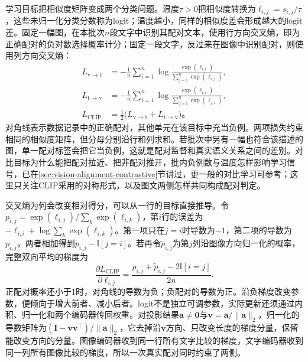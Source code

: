 学习目标把相似度矩阵变成两个分类问题。温度$\tau>0$把相似度转换为$\ell_{i,j}=s_{i,j}/\tau$，这些未归一化分类分数称为logit；温度越小，同样的相似度差会形成越大的logit差。固定一幅图，在本批次$n$段文字中识别其配对文本，使用行方向交叉熵，即为正确配对的负对数选择概率计分；固定一段文字，反过来在图像中识别配对，则使用列方向交叉熵：
\begin{equation}
  \begin{aligned}
    L_{\mathrm{v\to t}}
      &=-\frac1n\sum_{i=1}^n
        \log\frac{\exp(\ell_{i,i})}{\sum_{j=1}^n\exp(\ell_{i,j})},\\
    L_{\mathrm{t\to v}}
      &=-\frac1n\sum_{i=1}^n
        \log\frac{\exp(\ell_{i,i})}{\sum_{j=1}^n\exp(\ell_{j,i})},\\
    L_{\mathrm{CLIP}}&=\tfrac12
        \bigl(L_{\mathrm{v\to t}}+L_{\mathrm{t\to v}}\bigr)\text{。}
  \end{aligned}
  \label{eq:vision-clip-loss}
\end{equation}
对角线表示数据记录中的正确配对，其他单元在该目标中充当负例。两项损失约束相同的相似度矩阵，但分母分别沿行和列求和。若批次中另有一幅也符合该描述的图，单一配对标签会把它当负例，这就是配对监督和真实语义关系之间的差别。对比目标为什么能把配对拉近、把非配对推开，批内负例数与温度怎样影响学习信号，已在\ref{sec:vision-alignment-contrastive}节讲过，更一般的对比学习可参考；这里只关注CLIP采用的对称形式，以及图文两侧怎样共同构成配对判定。

交叉熵为何会改变相对得分，可以从一行的目标直接推导。令$p_{i,j}=\exp(\ell_{i,j})/\sum_k\exp(\ell_{i,k})$，第$i$行的误差为$-\ell_{i,i}+\log\sum_k\exp(\ell_{i,k})$。第一项只在$j=i$时导数为$-1$，第二项的导数为$p_{i,j}$，两者相加得到$p_{i,j}-\mathbb I[j=i]$。若再令$\widetilde p_{i,j}$为第$j$列沿图像方向归一化的概率，完整双向平均的梯度为
\begin{equation}
  \frac{\partial L_{\mathrm{CLIP}}}{\partial\ell_{i,j}}
   =\frac{p_{i,j}+\widetilde p_{i,j}
                 -2\mathbb I[i=j]}{2n}.
  \label{eq:vision-clip-logit-gradient}
\end{equation}
正配对概率还小于1时，对角线的导数为负；负配对的导数为正。沿负梯度改变参数，便倾向于增大前者、减小后者。logit不是独立可调参数，实际更新还须通过内积、归一化和两个编码器传回权重。对投影结果$\bm a\ne\bm0$与$\bm v=\bm a/\lVert\bm a\rVert_2$，归一化的导数矩阵为$(\bm I-\bm v\bm v^\top)/\lVert\bm a\rVert_2$，它去掉沿$\bm v$方向、只改变长度的梯度分量，保留能改变方向的分量。图像编码器收到同一行所有文字比较的梯度，文字编码器收到同一列所有图像比较的梯度，所以一次真实配对同时约束了两侧。


